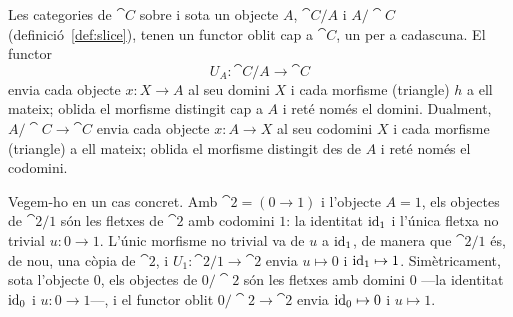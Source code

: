 \begin{exemple}
Les categories de $\cat{C}$ sobre i sota un objecte $A$, $\cat{C}/A$ i $A/\cat{C}$ (definició~\ref{def:slice}), tenen un functor oblit cap a $\cat{C}$, un per a cadascuna. El functor
\[
U_A\colon\cat{C}/A\to\cat{C}
\]
envia cada objecte $x\colon X\to A$ al seu domini $X$ i cada morfisme (triangle) $h$ a ell mateix; oblida el morfisme distingit cap a $A$ i reté només el domini. Dualment, $A/\cat{C}\to\cat{C}$ envia cada objecte $x\colon A\to X$ al seu codomini $X$ i cada morfisme (triangle) a ell mateix; oblida el morfisme distingit des de $A$ i reté només el codomini.

Vegem-ho en un cas concret. Amb $\cat{2}=(0\to 1)$ i l'objecte $A=1$, els objectes de $\cat{2}/1$ són les fletxes de $\cat{2}$ amb codomini $1$: la identitat $\operatorname{id}_1$ i l'única fletxa no trivial $u\colon 0\to 1$. L'únic morfisme no trivial va de $u$ a $\operatorname{id}_1$, de manera que $\cat{2}/1$ és, de nou, una còpia de $\cat{2}$, i $U_1\colon\cat{2}/1\to\cat{2}$ envia $u\mapsto 0$ i $\operatorname{id}_1\mapsto 1$. Simètricament, sota l'objecte $0$, els objectes de $0/\cat{2}$ són les fletxes amb domini $0$ ---la identitat $\operatorname{id}_0$ i $u\colon 0\to 1$---, i el functor oblit $0/\cat{2}\to\cat{2}$ envia $\operatorname{id}_0\mapsto 0$ i $u\mapsto 1$.
\end{exemple}

